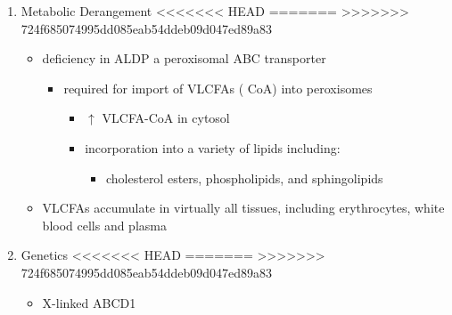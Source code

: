 \documentclass[fontsize=12pt]{scrartcl}
\begin{document}
\begin{enumerate}
\begin{enumerate}
\begin{enumerate}
\begin{enumerate}
\begin{table}[htbp]
\begin{enumerate}
\begin{enumerate}
\begin{enumerate}
\begin{enumerate}
\begin{enumerate}
\begin{enumerate}
\begin{enumerate}
\begin{enumerate}
\begin{enumerate}
\begin{itemize}
\begin{enumerate}
\begin{itemize}
\end{itemize}
\item Addison disease only
\begin{itemize}
\item primary adrenocortical insufficiency commonly by age 7.5 years
\item without evidence of neurologic abnormality
\begin{itemize}
\item some neurologic disability (most commonly AMN) usually
develops by middle age
\end{itemize}
\end{itemize}
\end{enumerate}
\end{itemize}

\item Metabolic Derangement
<<<<<<< HEAD
\label{sec:org3ed23b0}
=======
\label{sec:orge687b44}
>>>>>>> 724f685074995dd085eab54ddeb09d047ed89a83
\begin{itemize}
\item deficiency in ALDP a peroxisomal ABC transporter
\begin{itemize}
\item required for import of VLCFAs (\textpm{} CoA) into peroxisomes
\begin{itemize}
\item \(\uparrow\) VLCFA-CoA in cytosol
\item incorporation into a variety of lipids including:
\begin{itemize}
\item cholesterol esters, phospholipids, and sphingolipids
\end{itemize}
\end{itemize}
\end{itemize}
\item VLCFAs accumulate in virtually all tissues, including erythrocytes,
white blood cells and plasma
\end{itemize}

\item Genetics
<<<<<<< HEAD
\label{sec:org32089c7}
=======
\label{sec:orgcd4de4f}
>>>>>>> 724f685074995dd085eab54ddeb09d047ed89a83
\begin{itemize}
\item X-linked ABCD1
\end{itemize}


\end{enumerate}
\end{enumerate}
\end{enumerate}
\end{enumerate}
\end{enumerate}
\end{enumerate}
\end{enumerate}
\end{enumerate}
\end{enumerate}
\end{table}
\end{enumerate}
\end{enumerate}
\end{enumerate}
\end{enumerate}
\end{document}
